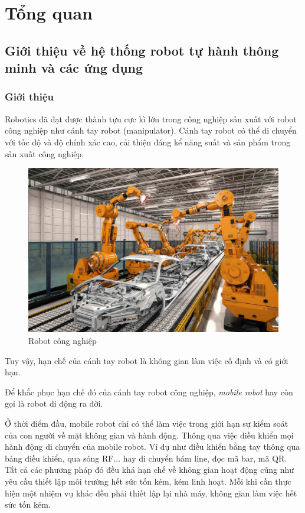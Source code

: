 \chapter{Tổng quan}

\section{Giới thiệu về hệ thống robot tự hành thông minh và các ứng dụng}
\subsection{Giới thiệu}

Robotics đã đạt được thành tựu cực kì lớn trong công nghiệp sản xuất với robot công nghiệp như cánh tay robot (manipulator). Cánh tay robot có thể di chuyển với tốc độ và độ chính xác cao, cải thiện đáng kể năng suất và sản phẩm trong sản xuất công nghiệp.
\cite{siegwart2011introduction}

\begin{figure}[h]
    \centering
    \includegraphics[width=13cm]{chapter1/figs/IndustrialRobot.jpg}
    \caption{Robot công nghiệp}
\end{figure}

Tuy vậy, hạn chế của cánh tay robot là không gian làm việc cố định và có giới hạn.

Để khắc phục hạn chế đó của cánh tay robot công nghiệp, \textit{mobile robot} hay còn gọi là robot di động ra đời. 

Ở thời điểm đầu, mobile robot chỉ có thể làm việc trong giới hạn sự kiểm soát của con người về mặt không gian và hành động. Thông qua việc điều khiển mọi hành động di chuyển của mobile robot. Ví dụ như điều khiển bằng tay thông qua bảng điều khiển, qua sóng RF... hay di chuyển bám line, đọc mã bar, mã QR. Tất cả các phương pháp đó đều khá hạn chế về không gian hoạt động cũng như yêu cầu thiết lập môi trường hết sức tốn kém, kém linh hoạt. Mỗi khi cần thực hiện một nhiệm vụ khác đều phải thiết lập lại nhà máy, không gian làm việc hết sức tốn kém.

